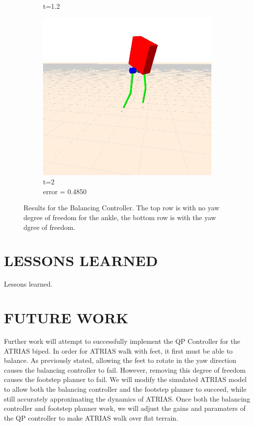 \documentclass[letterpaper, 10 pt, conference]{ieeeconf}  %
\begin{document}
\begin{figure}[t]
\begin{subfigure}[b]{0.3\textwidth}
        \caption{t=1.2}
        \label{fig:balanceYaw2}
    \end{subfigure} \hfill
    \begin{subfigure}[b]{0.3\textwidth}
      \centering
        \includegraphics[width=\textwidth] {figures/balanceYaw3.jpg}
        \caption{t=2\\error = 0.4850}
        \label{fig:balanceYaw3}
    \end{subfigure}
  \caption{Results for the Balancing Controller. The top row is with no yaw degree of freedom for the ankle, the bottom row is with the yaw dgree of freedom.}
  \label{fig:balancing}
\end{figure}


\section{LESSONS LEARNED}

Lessons learned.

\section{FUTURE WORK}
Further work will attempt to successfully implement the QP Controller for the ATRIAS biped. In order for ATRIAS walk with feet, it first must be able to balance. As previously stated, allowing the feet to rotate in the yaw direction causes the balancing controller to fail. However, removing this degree of freedom causes the footstep planner to fail. We will modify the simulated ATRIAS model to allow both the balancing controller and the footstep planner to succeed, while still accurately approximating the dynamics of ATRIAS. Once both the balancing controller and footstep planner work, we will adjust the gains and paramaters of the QP controller to make ATRIAS walk over flat terrain. 
\end{document}
